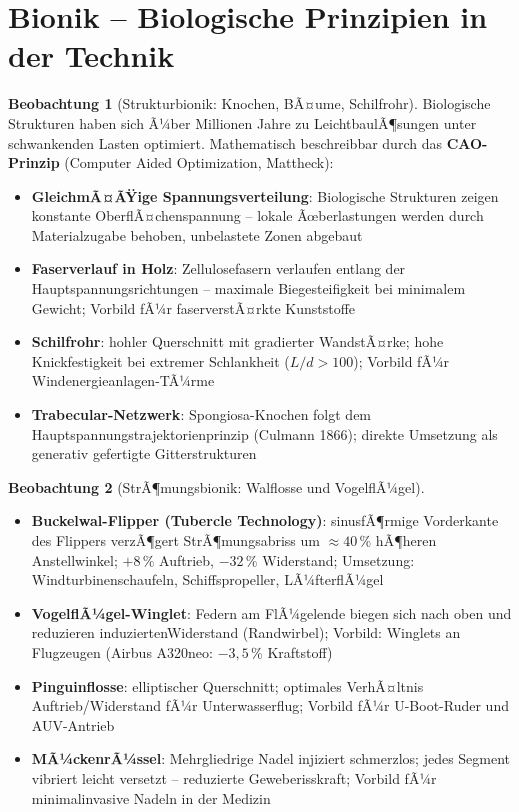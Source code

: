﻿\documentclass[a4paper,12pt]{report}
\theoremstyle{definition}
\newtheorem{beobachtung}{Beobachtung}
\begin{document}
\section{Bionik -- Biologische Prinzipien in der Technik}

\begin{beobachtung}[Strukturbionik: Knochen, BÃ¤ume, Schilfrohr]
Biologische Strukturen haben sich Ã¼ber Millionen Jahre zu LeichtbaulÃ¶sungen
unter schwankenden Lasten optimiert. Mathematisch beschreibbar durch
das \textbf{CAO-Prinzip} (Computer Aided Optimization, Mattheck):
\begin{itemize}
    \item[-] \textbf{GleichmÃ¤ÃŸige Spannungsverteilung}: Biologische Strukturen
          zeigen konstante OberflÃ¤chenspannung -- lokale Ãœberlastungen werden
          durch Materialzugabe behoben, unbelastete Zonen abgebaut
    \item[-] \textbf{Faserverlauf in Holz}: Zellulosefasern verlaufen entlang
          der Hauptspannungsrichtungen -- maximale Biegesteifigkeit bei
          minimalem Gewicht; Vorbild fÃ¼r faserverstÃ¤rkte Kunststoffe
    \item[-] \textbf{Schilfrohr}: hohler Querschnitt mit gradierter WandstÃ¤rke;
          hohe Knickfestigkeit bei extremer Schlankheit ($L/d > 100$);
          Vorbild fÃ¼r Windenergieanlagen-TÃ¼rme
    \item[-] \textbf{Trabecular-Netzwerk}: Spongiosa-Knochen folgt dem
          Hauptspannungstrajektorienprinzip (Culmann 1866);
          direkte Umsetzung als generativ gefertigte Gitterstrukturen
\end{itemize}
\end{beobachtung}

\begin{beobachtung}[StrÃ¶mungsbionik: Walflosse und VogelflÃ¼gel]
\begin{itemize}
    \item[-] \textbf{Buckelwal-Flipper (Tubercle Technology)}: sinusfÃ¶rmige
          Vorderkante des Flippers verzÃ¶gert StrÃ¶mungsabriss um $\approx 40\,\%$
          hÃ¶heren Anstellwinkel; $+8\,\%$ Auftrieb, $-32\,\%$ Widerstand;
          Umsetzung: Windturbinenschaufeln, Schiffspropeller, LÃ¼fterflÃ¼gel
    \item[-] \textbf{VogelflÃ¼gel-Winglet}: Federn am FlÃ¼gelende biegen sich
          nach oben und reduzieren induziertenWiderstand (Randwirbel);
          Vorbild: Winglets an Flugzeugen (Airbus A320neo: $-3{,}5\,\%$ Kraftstoff)
    \item[-] \textbf{Pinguinflosse}: elliptischer Querschnitt; optimales
          VerhÃ¤ltnis Auftrieb/Widerstand fÃ¼r Unterwasserflug;
          Vorbild fÃ¼r U-Boot-Ruder und AUV-Antrieb
    \item[-] \textbf{MÃ¼ckenrÃ¼ssel}: Mehrgliedrige Nadel injiziert schmerzlos;
          jedes Segment vibriert leicht versetzt -- reduzierte Geweberisskraft;
          Vorbild fÃ¼r minimalinvasive Nadeln in der Medizin
\end{itemize}
\end{beobachtung}
\end{document}
